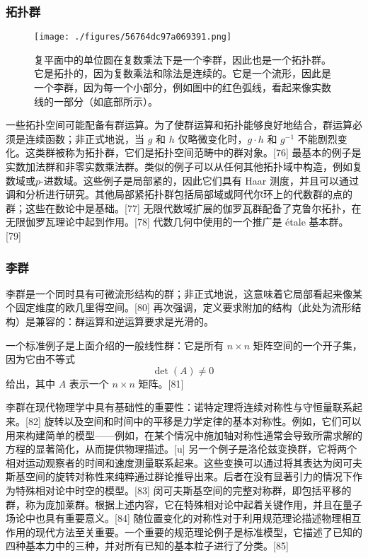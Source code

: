 \subsubsection{拓扑群}
\begin{figure}[ht]
\centering
\texttt{[image: ./figures/56764dc97a069391.png]}
\caption{复平面中的单位圆在复数乘法下是一个李群，因此也是一个拓扑群。它是拓扑的，因为复数乘法和除法是连续的。它是一个流形，因此是一个李群，因为每一个小部分，例如图中的红色弧线，看起来像实数线的一部分（如底部所示）。} \label{fig_GroupM_13}
\end{figure}
一些拓扑空间可能配备有群运算。为了使群运算和拓扑能够良好地结合，群运算必须是连续函数；非正式地说，当 \(g\) 和 \(h\) 仅略微变化时，\(g \cdot h\) 和 \(g^{-1}\) 不能剧烈变化。这类群被称为拓扑群，它们是拓扑空间范畴中的群对象。[76] 最基本的例子是实数加法群和非零实数乘法群。类似的例子可以从任何其他拓扑域中构造，例如复数域或\(p\)-进数域。这些例子是局部紧的，因此它们具有 Haar 测度，并且可以通过调和分析进行研究。其他局部紧拓扑群包括局部域或阿代尔环上的代数群的点的群；这些在数论中是基础。[77] 无限代数域扩展的伽罗瓦群配备了克鲁尔拓扑，在无限伽罗瓦理论中起到作用。[78] 代数几何中使用的一个推广是 étale 基本群。[79]
\subsubsection{李群}   
李群是一个同时具有可微流形结构的群；非正式地说，这意味着它局部看起来像某个固定维度的欧几里得空间。[80] 再次强调，定义要求附加的结构（此处为流形结构）是兼容的：群运算和逆运算要求是光滑的。

一个标准例子是上面介绍的一般线性群：它是所有 \(n \times n\) 矩阵空间的一个开子集，因为它由不等式 
\[\det(A) \neq 0~\] 
给出，其中 \(A\) 表示一个 \(n \times n\) 矩阵。[81]

李群在现代物理学中具有基础性的重要性：诺特定理将连续对称性与守恒量联系起来。[82] 旋转以及空间和时间中的平移是力学定律的基本对称性。例如，它们可以用来构建简单的模型——例如，在某个情况中施加轴对称性通常会导致所需求解的方程的显著简化，从而提供物理描述。[u] 另一个例子是洛伦兹变换群，它将两个相对运动观察者的时间和速度测量联系起来。这些变换可以通过将其表达为闵可夫斯基空间的旋转对称性来纯粹通过群论推导出来。后者在没有显著引力的情况下作为特殊相对论中时空的模型。[83] 闵可夫斯基空间的完整对称群，即包括平移的群，称为庞加莱群。根据上述内容，它在特殊相对论中起着关键作用，并且在量子场论中也具有重要意义。[84] 随位置变化的对称性对于利用规范理论描述物理相互作用的现代方法至关重要。一个重要的规范理论例子是标准模型，它描述了已知的四种基本力中的三种，并对所有已知的基本粒子进行了分类。[85]
